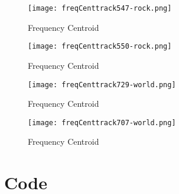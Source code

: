 \documentclass{article} %
\begin{document}
\begin{figure}[H]
\centering
\texttt{[image: freqCenttrack547-rock.png]}
\caption{Frequency Centroid}
\label{fig:cent547}
\end{figure}


\begin{figure}[H]
\centering
\texttt{[image: freqCenttrack550-rock.png]}
\caption{Frequency Centroid}
\label{fig:cent550}
\end{figure}


\begin{figure}[H]
\centering
\texttt{[image: freqCenttrack729-world.png]}
\caption{Frequency Centroid}
\label{fig:cent729}
\end{figure}


\begin{figure}[H]
\centering
\texttt{[image: freqCenttrack707-world.png]}
\caption{Frequency Centroid}
\label{fig:cent707}
\end{figure}


\clearpage
\section{Code}











\end{document}

